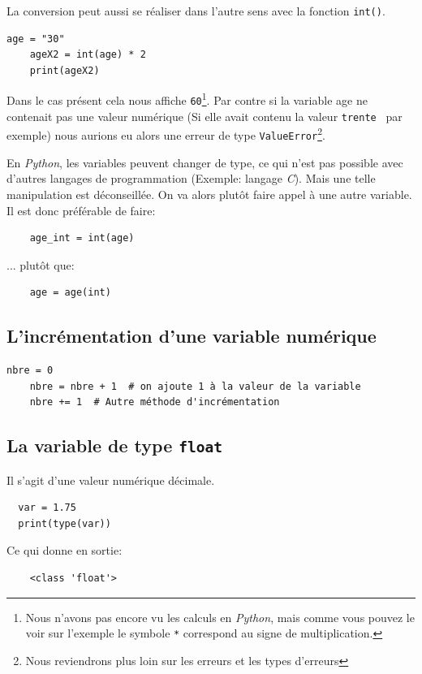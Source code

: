 \documentclass[a4paper,11pt]{book}
\begin{document}
La conversion peut aussi se réaliser dans l'autre sens avec la fonction \texttt{int()}.
\begin{lstlisting}[caption=Conversion avec la fonction \texttt{int}]
	age = "30"
	ageX2 = int(age) * 2
	print(ageX2)
\end{lstlisting}
\medskip

Dans le cas présent cela nous affiche \texttt{60}\footnote{Nous n'avons pas encore vu les calculs en \textit{Python}, mais comme vous pouvez le voir sur l'exemple le symbole \texttt{*} correspond au signe de multiplication.}. Par contre si la variable age ne contenait pas une valeur numérique (Si elle avait contenu la valeur \texttt{\og trente \fg} par exemple) nous aurions eu alors une erreur de type \texttt{ValueError}\footnote{Nous reviendrons plus loin sur les erreurs et les types d'erreurs}.
\medskip

En \textit{Python}, les variables peuvent changer de type, ce qui n'est pas possible avec d'autres langages de programmation (Exemple: langage \textit{C}). Mais une telle manipulation est déconseillée. On va alors plutôt faire appel à une autre variable. Il est donc préférable de faire:
\begin{verbatim}
    age_int = int(age)
\end{verbatim}
\medskip

... plutôt que:
\begin{verbatim}
    age = age(int)
\end{verbatim}
\medskip

\subsection*{L'incrémentation d'une variable numérique}
\begin{lstlisting}[caption=Principe de l'incrémentation]
    nbre = 0
    nbre = nbre + 1  # on ajoute 1 à la valeur de la variable
    nbre += 1  # Autre méthode d'incrémentation
\end{lstlisting}
\medskip

\subsection*{La variable de type \texttt{float}}
Il s'agit d'une valeur numérique décimale.
\begin{lstlisting}
  var = 1.75
  print(type(var))
\end{lstlisting}
\medskip

Ce qui donne en sortie:
\begin{verbatim}
    <class 'float'>
\end{verbatim}
\medskip
\end{document}

